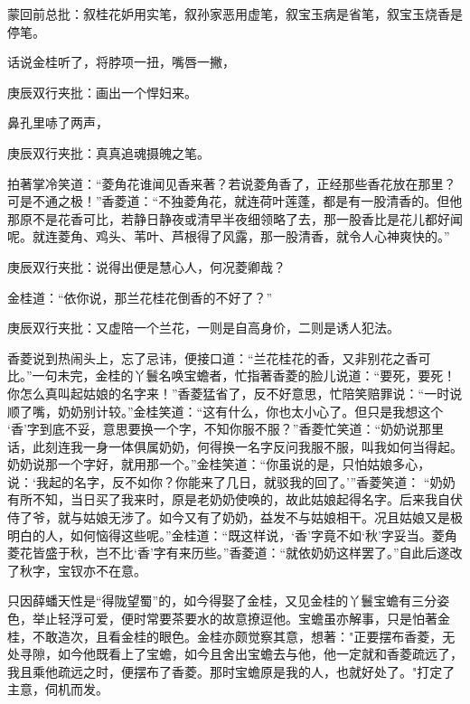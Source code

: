 
\begin{parag}
    \begin{note}蒙回前总批：叙桂花妒用实笔，叙孙家恶用虚笔，叙宝玉病是省笔，叙宝玉烧香是停笔。\end{note}
\end{parag}


\begin{parag}
    话说金桂听了，将脖项一扭，嘴唇一撇，\begin{note}庚辰双行夹批：画出一个悍妇来。\end{note}鼻孔里哧了两声，\begin{note}庚辰双行夹批：真真追魂摄魄之笔。\end{note}拍著掌冷笑道：“菱角花谁闻见香来著？若说菱角香了，正经那些香花放在那里？可是不通之极！”香菱道：“不独菱角花，就连荷叶莲蓬，都是有一股清香的。但他那原不是花香可比，若静日静夜或清早半夜细领略了去，那一股香比是花儿都好闻呢。就连菱角、鸡头、苇叶、芦根得了风露，那一股清香，就令人心神爽快的。”\begin{note}庚辰双行夹批：说得出便是慧心人，何况菱卿哉？\end{note}金桂道：“依你说，那兰花桂花倒香的不好了？”\begin{note}庚辰双行夹批：又虚陪一个兰花，一则是自高身价，二则是诱人犯法。\end{note}香菱说到热闹头上，忘了忌讳，便接口道：“兰花桂花的香，又非别花之香可比。”一句未完，金桂的丫鬟名唤宝蟾者，忙指著香菱的脸儿说道：“要死，要死！你怎么真叫起姑娘的名字来！”香菱猛省了，反不好意思，忙陪笑赔罪说：“一时说顺了嘴，奶奶别计较。”金桂笑道：“这有什么，你也太小心了。但只是我想这个 ‘香’字到底不妥，意思要换一个字，不知你服不服？”香菱忙笑道：“奶奶说那里话，此刻连我一身一体俱属奶奶，何得换一名字反问我服不服，叫我如何当得起。奶奶说那一个字好，就用那一个。”金桂笑道：“你虽说的是，只怕姑娘多心，说：‘我起的名字，反不如你？你能来了几日，就驳我的回了。’”香菱笑道： “奶奶有所不知，当日买了我来时，原是老奶奶使唤的，故此姑娘起得名字。后来我自伏侍了爷，就与姑娘无涉了。如今又有了奶奶，益发不与姑娘相干。况且姑娘又是极明白的人，如何恼得这些呢。”金桂道：“既这样说，‘香’字竟不如‘秋’字妥当。菱角菱花皆盛于秋，岂不比‘香’字有来历些。”香菱道：“就依奶奶这样罢了。”自此后遂改了秋字，宝钗亦不在意。
\end{parag}


\begin{parag}
    只因薛蟠天性是“得陇望蜀”的，如今得娶了金桂，又见金桂的丫鬟宝蟾有三分姿色，举止轻浮可爱，便时常要茶要水的故意撩逗他。宝蟾虽亦解事，只是怕著金桂，不敢造次，且看金桂的眼色。金桂亦颇觉察其意，想著："正要摆布香菱，无处寻隙，如今他既看上了宝蟾，如今且舍出宝蟾去与他，他一定就和香菱疏远了，我且乘他疏远之时，便摆布了香菱。那时宝蟾原是我的人，也就好处了。"打定了主意，伺机而发。
\end{parag}


